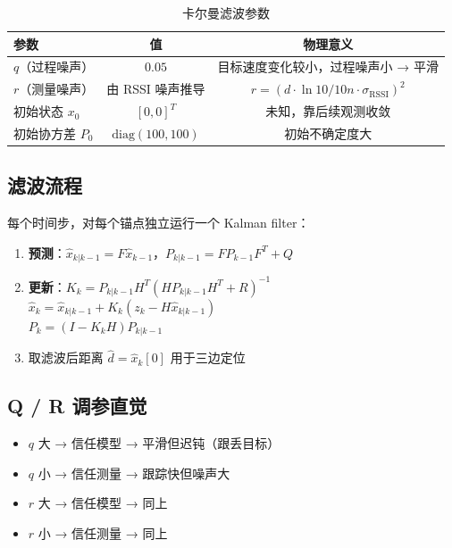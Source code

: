 \documentclass[11pt,a4paper]{article}
\begin{document}
\begin{table}[H]
\centering
\caption{卡尔曼滤波参数}
\begin{tabular}{lcc}
\toprule
\textbf{参数} & \textbf{值} & \textbf{物理意义} \\
\midrule
$q$（过程噪声） & $0.05$ & 目标速度变化较小，过程噪声小 → 平滑 \\
$r$（测量噪声） & 由 RSSI 噪声推导 & $r = (d \cdot \ln 10 / 10n \cdot \sigma_{\text{RSSI}})^2$ \\
初始状态 $x_0$ & $[0, 0]^T$ & 未知，靠后续观测收敛 \\
初始协方差 $P_0$ & $\text{diag}(100, 100)$ & 初始不确定度大 \\
\bottomrule
\end{tabular}
\end{table}

\subsection{滤波流程}

每个时间步，对每个锚点独立运行一个 Kalman filter：

\begin{enumerate}
    \item \textbf{预测}：$\hat{x}_{k|k-1} = F \hat{x}_{k-1}$，$P_{k|k-1} = F P_{k-1} F^T + Q$
    \item \textbf{更新}：$K_k = P_{k|k-1} H^T (H P_{k|k-1} H^T + R)^{-1}$ \\
    $\hat{x}_k = \hat{x}_{k|k-1} + K_k(z_k - H \hat{x}_{k|k-1})$ \\
    $P_k = (I - K_k H) P_{k|k-1}$
    \item 取滤波后距离 $\hat{d} = \hat{x}_k[0]$ 用于三边定位
\end{enumerate}

\subsection{Q / R 调参直觉}

\begin{itemize}
    \item $q$ 大 → 信任模型 → 平滑但迟钝（跟丢目标）
    \item $q$ 小 → 信任测量 → 跟踪快但噪声大
    \item $r$ 大 → 信任模型 → 同上
    \item $r$ 小 → 信任测量 → 同上
\end{itemize}

\end{document}
